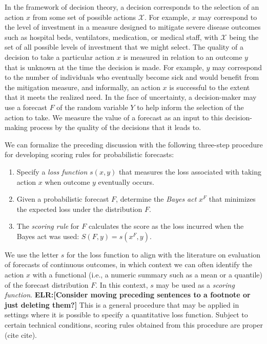 \documentclass{article}
\def\elr#1{{\color{cyan}\textbf{ELR:[#1]}}}
\begin{document}
In the framework of decision theory, a decision corresponds to the selection of an action $x$ from some set of possible actions $\mathcal{X}$. For example, $x$ may correspond to the level of investment in a measure designed to mitigate severe disease outcomes such as hospital beds, ventilators, medication, or medical staff, with $\mathcal{X}$ being the set of all possible levels of investment that we might select. The quality of a decision to take a particular action $x$ is measured in relation to an outcome $y$ that is unknown at the time the decision is made. For example, $y$ may correspond to the number of individuals who eventually become sick and would benefit from the mitigation measure, and informally, an action $x$ is successful to the extent that it meets the realized need. In the face of uncertainty, a decision-maker may use a forecast $F$ of the random variable $Y$ to help inform the selection of the action to take. We measure the value of a forecast as an input to this decision-making process by the quality of the decisions that it leads to.

We can formalize the preceding discussion with the following three-step procedure for developing scoring rules for probabilistic forecasts:
\begin{enumerate}
\item Specify a \emph{loss function} $s(x, y)$ that measures the loss associated with taking action $x$ when outcome $y$ eventually occurs.
\item Given a probabilistic forecast $F$, determine the \emph{Bayes act} $x^F$ that minimizes the expected loss under the distribution $F$.
\item The \emph{scoring rule} for $F$ calculates the score as the loss incurred when the Bayes act was used: $S(F, y) = s(x^F, y)$.
\end{enumerate}
We use the letter $s$ for the loss function to align with the literature on evaluation of forecasts of continuous outcomes, in which context we can often identify the action $x$ with a functional (i.e., a numeric summary such as a mean or a quantile) of the forecast distribution $F$. In this context, $s$ may be used as a \emph{scoring function}. \elr{Consider moving preceding sentences to a footnote or just deleting them?}
This is a general procedure that may be applied in settings where it is possible to specify a quantitative loss function. Subject to certain technical conditions, scoring rules obtained from this procedure are proper (cite cite).

\end{document}
